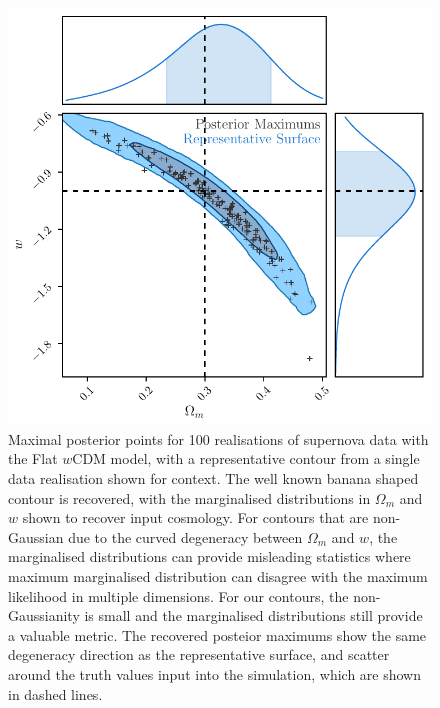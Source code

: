 \documentclass[a4paper,fleqn,usenatbib,manuscript]{emulateapj}
\newcommand{\blue}{\color{blue}}
\begin{document}
\begin{figure}
	\begin{center}
		\includegraphics[width=\columnwidth]{simpleApproximateModelW.pdf}
	\end{center}
	\caption{Maximal posterior points for 100 realisations of supernova data with the Flat $w$CDM model, with a representative contour from a single data realisation shown for context. The well known banana shaped contour is recovered, with the marginalised distributions in $\Omega_m$ and $w$ {\blue shown to recover input cosmology. For contours that are non-Gaussian due to the curved degeneracy between $\Omega_m$ and $w$, the marginalised distributions can provide misleading statistics where maximum marginalised distribution can disagree with the maximum likelihood in multiple dimensions. For our contours, the non-Gaussianity is small and the marginalised distributions still provide a valuable metric.} The recovered posteior maximums show the same degeneracy direction as the representative surface, and scatter around the truth values input into the simulation, which are shown in dashed lines.}
	\label{fig:simple_w}
\end{figure}
\end{document}
